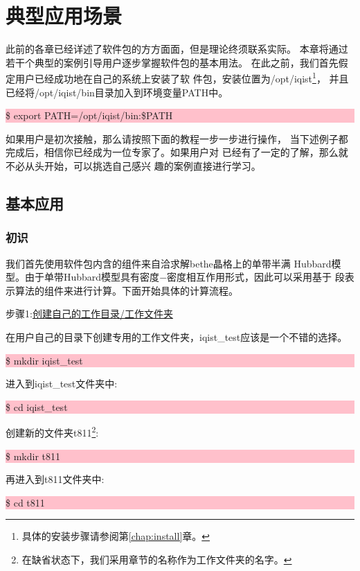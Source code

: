 \chapter{{\iqist}典型应用场景}
\label{chap:application}

此前的各章已经详述了{\iqist}软件包的方方面面，但是理论终须联系实际。
本章将通过若干个典型的案例引导用户逐步掌握{\iqist}软件包的基本用法。
在此之前，我们首先假定用户已经成功地在自己的系统上安装了{\iqist}软
件包，安装位置为/opt/iqist\footnote{具体的安装步骤请参阅第\ref{chap:install}章。}，
并且已经将/opt/iqist/bin目录加入到环境变量PATH中。

\noindent\colorbox{pink}{\parbox[r]{\linewidth}{\quad \$ export PATH=/opt/iqist/bin:\$PATH }}

如果用户是初次接触{\iqist}，那么请按照下面的教程一步一步进行操作，
当下述例子都完成后，相信你已经成为一位{\iqist}专家了。如果用户对
{\iqist}已经有了一定的了解，那么就不必从头开始，可以挑选自己感兴
趣的案例直接进行学习。

\section{基本应用}
\label{sec:basic}

\subsection{初识{\iqist}}
\label{subsec:1band}

我们首先使用{\iqist}软件包内含的{\azalea}组件来自洽求解bethe晶格上的单带半满
Hubbard模型。由于单带Hubbard模型具有密度$-$密度相互作用形式，因此可以采用基于
段表示算法的{\azalea}组件来进行计算。下面开始具体的计算流程。

步骤1:\underline{创建自己的工作目录/工作文件夹}

在用户自己的目录下创建专用的工作文件夹，iqist\_test应该是一个不错的选择。

\noindent\colorbox{pink}{\parbox[r]{\linewidth}{\quad \$ mkdir iqist\_test }}

进入到iqist\_test文件夹中:

\noindent\colorbox{pink}{\parbox[r]{\linewidth}{\quad \$ cd iqist\_test }}

创建新的文件夹t811\footnote{在缺省状态下，我们采用章节的名称作为工作文件夹的名字。}:

\noindent\colorbox{pink}{\parbox[r]{\linewidth}{\quad \$ mkdir t811 }}

再进入到t811文件夹中:

\noindent\colorbox{pink}{\parbox[r]{\linewidth}{\quad \$ cd t811 }}

